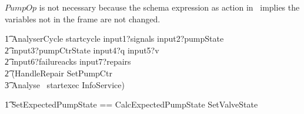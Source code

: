 \documentclass{report} %
\begin{document}
$PumpOp$ is not necessary because the schema expression as action in \Circus\ implies the variables not in the frame are not changed.
\begin{circusaction}
    \t1 AnalyserCycle \circdef startcycle \then input1?signals \then input2?pumpState \then \\
        \t2 input3?pumpCtrState \then input4?q \then input5?v \then \\
        \t2 input6?failureacks \then input7?repairs \then \\
        \t2 (\lschexpract HandleRepair \rschexpract \circseq \lschexpract SetPumpCtr \rschexpract \circseq \\
            \t3 \lschexpract Analyse \rschexpract \circseq\ startexec \then InfoService) \\
\end{circusaction}
\begin{zed}
    \t1 SetExpectedPumpState == CalcExpectedPumpState \land SetValveState \\
\end{zed}
\end{document}
